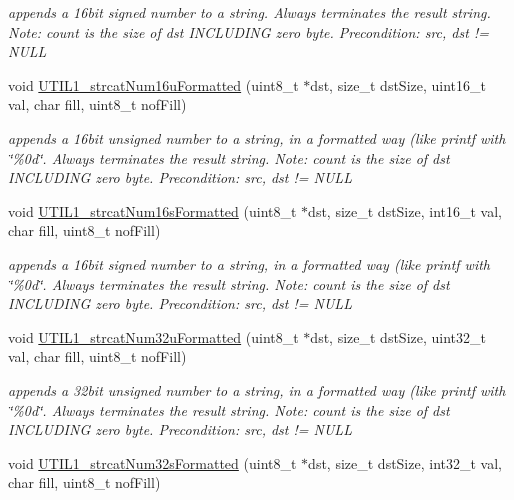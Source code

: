 \begin{DoxyCompactItemize}
\begin{DoxyCompactList}\small\item\em appends a 16bit signed number to a string. Always terminates the result string. Note\+: count is the size of dst I\+N\+C\+L\+U\+D\+I\+NG zero byte. Precondition\+: src, dst != N\+U\+LL \end{DoxyCompactList}\item 
void \hyperlink{group___u_t_i_l1__module_ga8ca2584fe8b064f672e231ac36a47285}{U\+T\+I\+L1\+\_\+strcat\+Num16u\+Formatted} (uint8\+\_\+t $\ast$dst, size\+\_\+t dst\+Size, uint16\+\_\+t val, char fill, uint8\+\_\+t nof\+Fill)
\begin{DoxyCompactList}\small\item\em appends a 16bit unsigned number to a string, in a formatted way (like printf with \char`\"{}\%0d\char`\"{}. Always terminates the result string. Note\+: count is the size of dst I\+N\+C\+L\+U\+D\+I\+NG zero byte. Precondition\+: src, dst != N\+U\+LL \end{DoxyCompactList}\item 
void \hyperlink{group___u_t_i_l1__module_ga124aff9bf4ad2ff84cbe3346fcdbb02b}{U\+T\+I\+L1\+\_\+strcat\+Num16s\+Formatted} (uint8\+\_\+t $\ast$dst, size\+\_\+t dst\+Size, int16\+\_\+t val, char fill, uint8\+\_\+t nof\+Fill)
\begin{DoxyCompactList}\small\item\em appends a 16bit signed number to a string, in a formatted way (like printf with \char`\"{}\%0d\char`\"{}. Always terminates the result string. Note\+: count is the size of dst I\+N\+C\+L\+U\+D\+I\+NG zero byte. Precondition\+: src, dst != N\+U\+LL \end{DoxyCompactList}\item 
void \hyperlink{group___u_t_i_l1__module_ga259e632bead66f672140daaedd94c5d3}{U\+T\+I\+L1\+\_\+strcat\+Num32u\+Formatted} (uint8\+\_\+t $\ast$dst, size\+\_\+t dst\+Size, uint32\+\_\+t val, char fill, uint8\+\_\+t nof\+Fill)
\begin{DoxyCompactList}\small\item\em appends a 32bit unsigned number to a string, in a formatted way (like printf with \char`\"{}\%0d\char`\"{}. Always terminates the result string. Note\+: count is the size of dst I\+N\+C\+L\+U\+D\+I\+NG zero byte. Precondition\+: src, dst != N\+U\+LL \end{DoxyCompactList}\item 
void \hyperlink{group___u_t_i_l1__module_ga8371cf0db923bbb5c09c29f8c58abffd}{U\+T\+I\+L1\+\_\+strcat\+Num32s\+Formatted} (uint8\+\_\+t $\ast$dst, size\+\_\+t dst\+Size, int32\+\_\+t val, char fill, uint8\+\_\+t nof\+Fill)

\end{DoxyCompactItemize}
